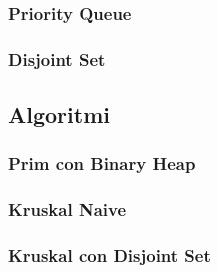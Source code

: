 \subsubsection{Priority Queue}

\subsubsection{Disjoint Set}

\subsection{Algoritmi}

\subsubsection{Prim con Binary Heap}

\subsubsection{Kruskal Naive}

\subsubsection{Kruskal con Disjoint Set}
